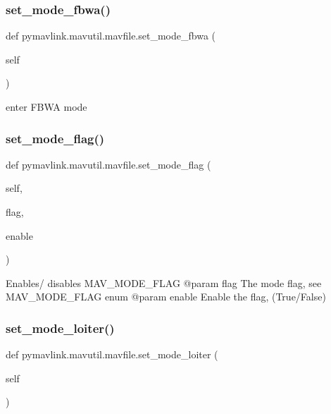 \subsubsection{\texorpdfstring{set\+\_\+mode\+\_\+fbwa()}{set\_mode\_fbwa()}}
{\footnotesize\ttfamily def pymavlink.\+mavutil.\+mavfile.\+set\+\_\+mode\+\_\+fbwa (\begin{DoxyParamCaption}\item[{}]{self }\end{DoxyParamCaption})}

\begin{DoxyVerb}enter FBWA mode\end{DoxyVerb}
 \mbox{\label{classpymavlink_1_1mavutil_1_1mavfile_a67cb3ddd8971781b673bcd676596517c}} 
\subsubsection{\texorpdfstring{set\+\_\+mode\+\_\+flag()}{set\_mode\_flag()}}
{\footnotesize\ttfamily def pymavlink.\+mavutil.\+mavfile.\+set\+\_\+mode\+\_\+flag (\begin{DoxyParamCaption}\item[{}]{self,  }\item[{}]{flag,  }\item[{}]{enable }\end{DoxyParamCaption})}

\begin{DoxyVerb}Enables/ disables MAV_MODE_FLAG
@param flag The mode flag, 
  see MAV_MODE_FLAG enum
@param enable Enable the flag, (True/False)
\end{DoxyVerb}
 \mbox{\label{classpymavlink_1_1mavutil_1_1mavfile_a93705650b06f0debf62ff0ddc8e1bfee}} 
\subsubsection{\texorpdfstring{set\+\_\+mode\+\_\+loiter()}{set\_mode\_loiter()}}
{\footnotesize\ttfamily def pymavlink.\+mavutil.\+mavfile.\+set\+\_\+mode\+\_\+loiter (\begin{DoxyParamCaption}\item[{}]{self }\end{DoxyParamCaption})}

